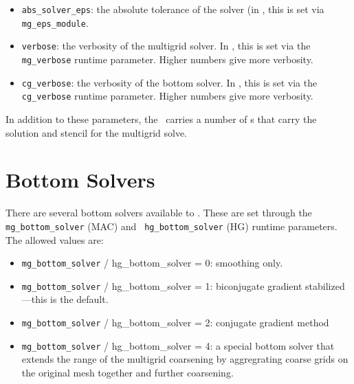 \begin{itemize}
\item {\tt abs\_solver\_eps}: the absolute tolerance of the solver (in
  \maestro, this is set via {\tt mg\_eps\_module}.

\item {\tt verbose}: the verbosity of the multigrid solver.  In \maestro,
  this is set via the {\tt mg\_verbose} runtime parameter.  Higher
  numbers give more verbosity.

\item {\tt cg\_verbose}: the verbosity of the bottom solver.  In \maestro,
  this is set via the {\tt cg\_verbose} runtime parameter.  Higher
  numbers give more verbosity.

\end{itemize}

In addition to these parameters, the \mgtower\ carries a number of
\multifab s that carry the solution and stencil for the multigrid
solve.


\section{Bottom Solvers}

There are several bottom solvers available to \maestro.  These are set
through the {\tt mg\_bottom\_solver} (MAC) and {\tt
  hg\_bottom\_solver} (HG) runtime parameters.  The allowed values
  are:

\begin{itemize}

\item {\tt mg\_bottom\_solver} / {hg\_bottom\_solver} = 0: smoothing only.

\item {\tt mg\_bottom\_solver} / {hg\_bottom\_solver} = 1: biconjugate
  gradient stabilized---this is the default.

\item {\tt mg\_bottom\_solver} / {hg\_bottom\_solver} = 2: conjugate
  gradient method

\item {\tt mg\_bottom\_solver} / {hg\_bottom\_solver} = 4: a special 
  bottom solver that extends the range of the multigrid coarsening
  by aggregrating coarse grids on the original mesh together and
  further coarsening. 

\end{itemize}


